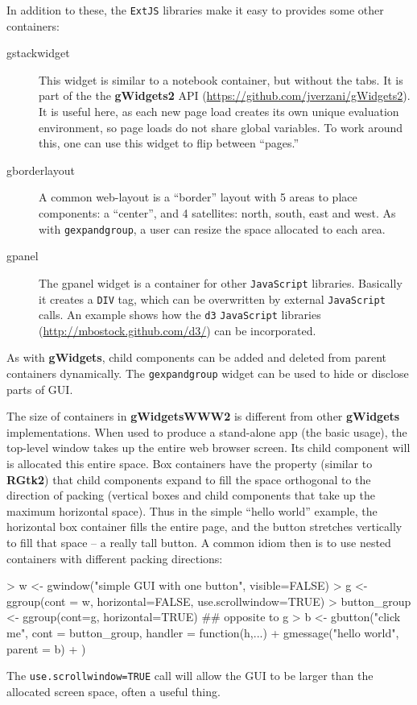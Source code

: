 \documentclass[12pt]{article}
\newcommand{\pkg}[1]{\textbf{#1}}
\newcommand{\code}[1]{\texttt{#1}}
\newcommand{\proglang}[1]{\code{#1}}
\newcommand{\javascript}{\proglang{JavaScript}}
\begin{document}
In addition to these, the \code{ExtJS} libraries make it easy to
provides some other containers:
\begin{description}
\item[gstackwidget] This widget is similar to a notebook container,
  but without the tabs. It is part of the the \pkg{gWidgets2} API
  (\url{https://github.com/jverzani/gWidgets2}). It is useful here, as
  each new page load creates its own unique evaluation environment, so
  page loads do not share global variables. To work around this, one
  can use this widget to flip between ``pages.''
\item[gborderlayout] A common web-layout is a ``border'' layout with 5
  areas to place components: a ``center'', and 4 satellites: north,
  south, east and west. As with \code{gexpandgroup}, a user can resize
  the space allocated to each area.
\item[gpanel] The gpanel widget is a container for other \javascript{}
  libraries. Basically it creates a \code{DIV} tag, which can be
  overwritten by external \javascript{} calls. An example shows how the
  \code{d3} \javascript{} libraries
  (\url{http://mbostock.github.com/d3/}) can be incorporated.
\end{description}

As with \pkg{gWidgets}, child components can be added and deleted from
parent containers dynamically. The \code{gexpandgroup} widget can be
used to hide or disclose parts of GUI.

The size of containers in \pkg{gWidgetsWWW2} is different from other
\pkg{gWidgets} implementations. When used to produce a stand-alone app
(the basic usage), the top-level window takes up the entire web
browser screen. Its child component will is allocated this entire
space. Box containers have the property (similar to \pkg{RGtk2}) that
child components expand to fill the space orthogonal to the direction
of packing (vertical boxes and child components that take up the
maximum horizontal space). Thus in the simple ``hello world'' example,
the horizontal box container fills the entire page, and the button
stretches vertically to fill that space -- a really tall button. A
common idiom then is to use nested containers with different packing directions:
\begin{Schunk}
\begin{Sinput}
> w <- gwindow("simple GUI with one button", visible=FALSE)
> g <- ggroup(cont = w, horizontal=FALSE, use.scrollwindow=TRUE)
> button_group <- ggroup(cont=g, horizontal=TRUE) ## opposite to g
> b <- gbutton("click me", cont = button_group, handler = function(h,...) {
+   gmessage("hello world", parent = b)
+ })
\end{Sinput}
\end{Schunk}
The \code{use.scrollwindow=TRUE} call will allow the GUI to be larger
than the allocated screen space, often a useful thing.
\end{document}
